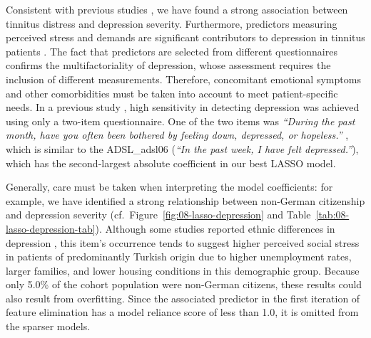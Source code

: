 \documentclass[
  oneside]{book}
\begin{document}
Consistent with previous studies \autocite{Langguth:TinnitusDepression2011}, we have found a strong association between tinnitus distress and depression severity.
Furthermore, predictors measuring perceived stress and demands are significant contributors to depression in tinnitus patients \autocite{Trevis:TinnitusReview2018}.
The fact that predictors are selected from different questionnaires confirms the multifactoriality of depression, whose assessment requires the inclusion of different measurements.
Therefore, concomitant emotional symptoms and other comorbidities must be taken into account to meet patient-specific needs.
In a previous study \autocite{Whooley:2q_depression1997}, high sensitivity in detecting depression was achieved using only a two-item questionnaire.
One of the two items was \emph{``During the past month, have you often been bothered by feeling down, depressed, or hopeless.''} \autocite{Whooley:2q_depression1997}, which is similar to the ADSL\_adsl06 (\emph{``In the past week, I have felt depressed.''}), which has the second-largest absolute coefficient in our best LASSO model.

Generally, care must be taken when interpreting the model coefficients:
for example, we have identified a strong relationship between non-German citizenship and depression severity (cf.~Figure~\ref{fig:08-lasso-depression} and Table~\ref{tab:08-lasso-depression-tab}).
Although some studies reported ethnic differences in depression \autocite{Riolo:DepressionEthnicity2005,Weinberger:DepressionEthnicity2018}, this item's occurrence tends to suggest higher perceived social stress in patients of predominantly Turkish origin due to higher unemployment rates, larger families, and lower housing conditions in this demographic group.
Because only 5.0\% of the cohort population were non-German citizens, these results could also result from overfitting.
Since the associated predictor in the first iteration of feature elimination has a model reliance score of less than 1.0, it is omitted from the sparser models.
\end{document}
